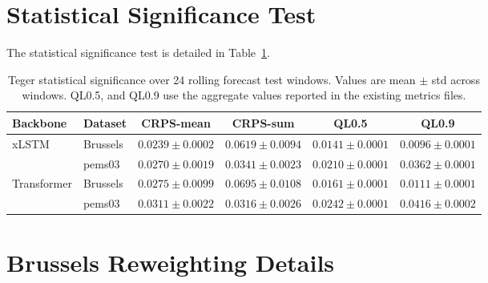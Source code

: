\documentclass{article}
\theoremstyle{plain}
\theoremstyle{definition}
\theoremstyle{remark}
\begin{document}
\section{Statistical Significance Test}
The statistical significance test is detailed in Table~\ref{tab:xlstm-statistical-results}.

\begin{table}[t]
\centering
\caption{Teger statistical significance over 24 rolling forecast test windows. Values are mean \(\pm\) std across windows. QL0.5,  and QL0.9 use the aggregate values reported in the existing metrics files.}
\label{tab:xlstm-statistical-results}
\small
\begin{tabular}{llcccc}
\toprule
Backbone & Dataset & CRPS-mean & CRPS-sum & QL0.5 & QL0.9 \\
\midrule
\multirow{2}{*}{xLSTM}
  & Brussels & \textbf{\(0.0239 \pm 0.0002\)} & \textbf{\(0.0619 \pm 0.0094\)} & \textbf{\(0.0141 \pm 0.0001\)} & \(0.0096 \pm 0.0001\) \\
  & pems03 & \(0.0270 \pm 0.0019\) & \(0.0341 \pm 0.0023\) & \(0.0210 \pm 0.0001\) & \(0.0362 \pm 0.0001\) \\
\midrule
\multirow{2}{*}{Transformer}
  & Brussels & \(0.0275 \pm 0.0099\) & \(0.0695 \pm 0.0108\) & \(0.0161 \pm 0.0001\) & \(0.0111 \pm 0.0001\) \\
  & pems03 & \(0.0311 \pm 0.0022\) & \(0.0316 \pm 0.0026\) & \(0.0242 \pm 0.0001\) & \(0.0416 \pm 0.0002\) \\
\bottomrule
\end{tabular}
\end{table}

\section{Brussels Reweighting Details}\label{Brussels_des}
\end{document}
